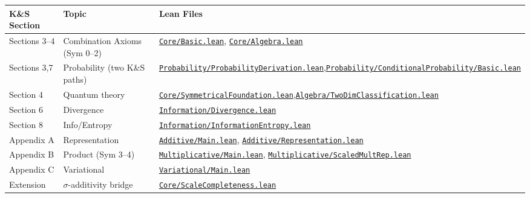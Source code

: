 \documentclass[11pt]{article}
\theoremstyle{definition}
\theoremstyle{remark}
\begin{document}
\begin{center}
\small
\begin{longtable}{p{2.5cm}p{4cm}p{7.5cm}}
\toprule
\textbf{K\&S Section} & \textbf{Topic} & \textbf{Lean Files} \\
\midrule
\endhead
Sections 3--4 & Combination Axioms (Sym 0--2) & \href{https://github.com/zariuq/ks-foundations-of-inference/blob/main/KnuthSkilling/Core/Basic.lean}{\texttt{Core/Basic.lean}}, \href{https://github.com/zariuq/ks-foundations-of-inference/blob/main/KnuthSkilling/Core/Algebra.lean}{\texttt{Core/Algebra.lean}} \\
Sections 3,7 & Probability (two K\&S paths) & \href{https://github.com/zariuq/ks-foundations-of-inference/blob/main/KnuthSkilling/Probability/ProbabilityDerivation.lean}{\texttt{Probability/ProbabilityDerivation.lean}},\newline \href{https://github.com/zariuq/ks-foundations-of-inference/blob/main/KnuthSkilling/Probability/ConditionalProbability/Basic.lean}{\texttt{Probability/ConditionalProbability/Basic.lean}} \\
Section 4 & Quantum theory & \href{https://github.com/zariuq/ks-foundations-of-inference/blob/main/KnuthSkilling/Core/SymmetricalFoundation.lean}{\texttt{Core/SymmetricalFoundation.lean}},\newline \href{https://github.com/zariuq/ks-foundations-of-inference/blob/main/Algebra/TwoDimClassification.lean}{\texttt{Algebra/TwoDimClassification.lean}} \\
Section 6 & Divergence & \href{https://github.com/zariuq/ks-foundations-of-inference/blob/main/KnuthSkilling/Information/Divergence.lean}{\texttt{Information/Divergence.lean}} \\
Section 8 & Info/Entropy & \href{https://github.com/zariuq/ks-foundations-of-inference/blob/main/KnuthSkilling/Information/InformationEntropy.lean}{\texttt{Information/InformationEntropy.lean}} \\
Appendix A & Representation & \href{https://github.com/zariuq/ks-foundations-of-inference/blob/main/KnuthSkilling/Additive/Main.lean}{\texttt{Additive/Main.lean}}, \href{https://github.com/zariuq/ks-foundations-of-inference/blob/main/KnuthSkilling/Additive/Representation.lean}{\texttt{Additive/Representation.lean}} \\
Appendix B & Product (Sym 3--4) & \href{https://github.com/zariuq/ks-foundations-of-inference/blob/main/KnuthSkilling/Multiplicative/Main.lean}{\texttt{Multiplicative/Main.lean}}, \href{https://github.com/zariuq/ks-foundations-of-inference/blob/main/KnuthSkilling/Multiplicative/ScaledMultRep.lean}{\texttt{Multiplicative/ScaledMultRep.lean}} \\
Appendix C & Variational & \href{https://github.com/zariuq/ks-foundations-of-inference/blob/main/KnuthSkilling/Variational/Main.lean}{\texttt{Variational/Main.lean}} \\
Extension & $\sigma$-additivity bridge & \href{https://github.com/zariuq/ks-foundations-of-inference/blob/main/KnuthSkilling/Core/ScaleCompleteness.lean}{\texttt{Core/ScaleCompleteness.lean}} \\
\bottomrule
\end{longtable}
\end{center}
\end{document}
